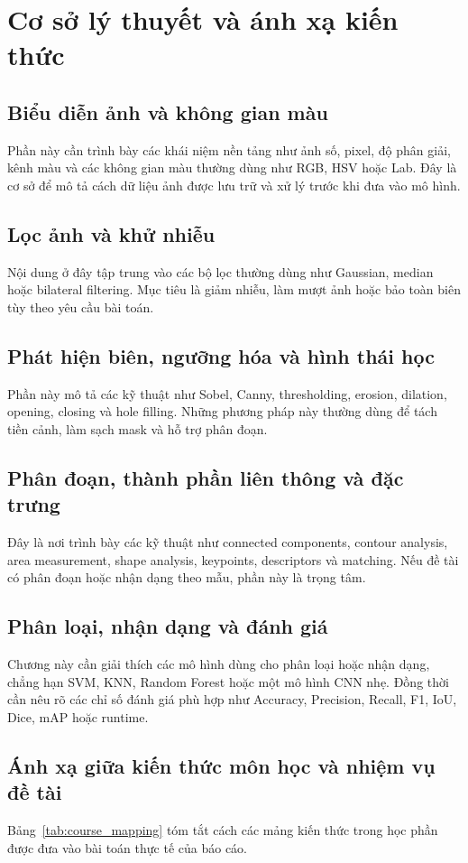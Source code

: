 \chapter{Cơ sở lý thuyết và ánh xạ kiến thức}

\section{Biểu diễn ảnh và không gian màu}
Phần này cần trình bày các khái niệm nền tảng như ảnh số, pixel, độ phân giải, kênh màu và các không gian màu thường dùng như RGB, HSV hoặc Lab. Đây là cơ sở để mô tả cách dữ liệu ảnh được lưu trữ và xử lý trước khi đưa vào mô hình.

\section{Lọc ảnh và khử nhiễu}
Nội dung ở đây tập trung vào các bộ lọc thường dùng như Gaussian, median hoặc bilateral filtering. Mục tiêu là giảm nhiễu, làm mượt ảnh hoặc bảo toàn biên tùy theo yêu cầu bài toán.

\section{Phát hiện biên, ngưỡng hóa và hình thái học}
Phần này mô tả các kỹ thuật như Sobel, Canny, thresholding, erosion, dilation, opening, closing và hole filling. Những phương pháp này thường dùng để tách tiền cảnh, làm sạch mask và hỗ trợ phân đoạn.

\section{Phân đoạn, thành phần liên thông và đặc trưng}
Đây là nơi trình bày các kỹ thuật như connected components, contour analysis, area measurement, shape analysis, keypoints, descriptors và matching. Nếu đề tài có phân đoạn hoặc nhận dạng theo mẫu, phần này là trọng tâm.

\section{Phân loại, nhận dạng và đánh giá}
Chương này cần giải thích các mô hình dùng cho phân loại hoặc nhận dạng, chẳng hạn SVM, KNN, Random Forest hoặc một mô hình CNN nhẹ. Đồng thời cần nêu rõ các chỉ số đánh giá phù hợp như Accuracy, Precision, Recall, F1, IoU, Dice, mAP hoặc runtime.

\section{Ánh xạ giữa kiến thức môn học và nhiệm vụ đề tài}
Bảng~\ref{tab:course_mapping} tóm tắt cách các mảng kiến thức trong học phần được đưa vào bài toán thực tế của báo cáo.

